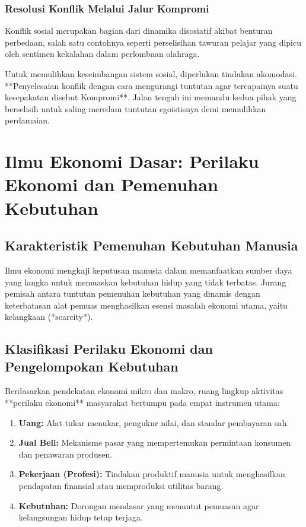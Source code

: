 \documentclass[12pt, a4paper]{article}
\begin{document}
\subsubsection{Resolusi Konflik Melalui Jalur Kompromi}
Konflik sosial merupakan bagian dari dinamika disosiatif akibat benturan perbedaan, salah satu contohnya seperti perselisihan tawuran pelajar yang dipicu oleh sentimen kekalahan dalam perlombaan olahraga.

Untuk memulihkan keseimbangan sistem sosial, diperlukan tindakan akomodasi. **Penyelesaian konflik dengan cara mengurangi tuntutan agar tercapainya suatu kesepakatan disebut Kompromi**. Jalan tengah ini memandu kedua pihak yang berselisih untuk saling meredam tuntutan egoistisnya demi memulihkan perdamaian.

\newpage
\section{Ilmu Ekonomi Dasar: Perilaku Ekonomi dan Pemenuhan Kebutuhan}

\subsection{Karakteristik Pemenuhan Kebutuhan Manusia}
Ilmu ekonomi mengkaji keputusan manusia dalam memanfaatkan sumber daya yang langka untuk memuaskan kebutuhan hidup yang tidak terbatas. Jurang pemisah antara tuntutan pemenuhan kebutuhan yang dinamis dengan keterbatasan alat pemuas menghasilkan esensi masalah ekonomi utama, yaitu kelangkaan (*scarcity*).

\subsection{Klasifikasi Perilaku Ekonomi dan Pengelompokan Kebutuhan}
Berdasarkan pendekatan ekonomi mikro dan makro, ruang lingkup aktivitas **perilaku ekonomi** masyarakat bertumpu pada empat instrumen utama:
\begin{enumerate}
    \item \textbf{Uang:} Alat tukar menukar, pengukur nilai, dan standar pembayaran sah.
    \item \textbf{Jual Beli:} Mekanisme pasar yang mempertemukan permintaan konsumen dan penawaran produsen.
    \item \textbf{Pekerjaan (Profesi):} Tindakan produktif manusia untuk menghasilkan pendapatan finansial atau memproduksi utilitas barang.
    \item \textbf{Kebutuhan:} Dorongan mendasar yang menuntut pemuasan agar kelangsungan hidup tetap terjaga.
\end{enumerate}
\end{document}
